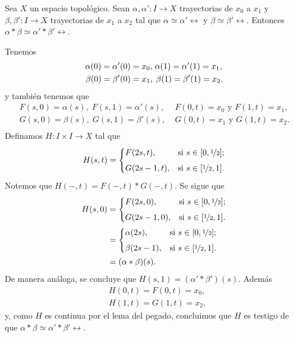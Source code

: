     \begin{lema}
        Sea $X$ un espacio topológico. Sean
        $\alpha,\alpha':I\to X$ trayectorias de $x_0$ a $x_1$ y $\beta,\beta':I\to X$ trayectorias de $x_1$ a $x_2$ tal que $\alpha\simeq\alpha'\rel$ y $\beta\simeq\beta'\rel$. Entonces $\alpha*\beta\simeq \alpha'*\beta'\rel.$
    \end{lema}
    \begin{dem}
        Tenemos 
        \begin{align*}
            \alpha(0)=\alpha'(0)=x_0,&\; \alpha(1)=\alpha'(1)=x_1,\\
            \beta(0)=\beta'(0)=x_1,&\;\hspace{0.5mm}
            \beta(1)=\beta'(1)=x_2.
        \end{align*}
        y también tenemos que
        \begin{align*}
            F(s,0)=\alpha(s),\; F(s,1)=\alpha'(s),&\; F(0,t)=x_0 \text{ y } F(1,t)=x_1,\\
            G(s,0)=\beta(s),\; G(s,1)=\beta'(s),&\; G(0,t)=x_1 \text{ y } G(1,t)=x_2.\\
        \end{align*}
        Definamos $H:I\times I\to X$ tal que 
    \begin{equation*}
        H(s,t)  =
    \begin{cases} 
        F(2s,t), & \text{si } s\in [0,\nicefrac{1}{2}]; \\[1ex]
        G(2s-1,t), & \text{si } s \in [\nicefrac{1}{2},1].
    \end{cases}
    \end{equation*}
        Notemos que $H(-,t)=F(-,t)*G(-,t)$. Se sigue que 
        \begin{align*}
        H(s,0) &= 
     \begin{cases} 
        F(2s,0), & \text{si } s\in [0,\nicefrac{1}{2}]; \\[1ex]
        G(2s-1,0), & \text{si } s \in [\nicefrac{1}{2},1].
    \end{cases}\\
    &= 
     \begin{cases} 
        \alpha(2s), & \text{si } s\in [0,\nicefrac{1}{2}]; \\[1ex]
       \beta(2s-1), & \text{si } s \in [\nicefrac{1}{2},1].
    \end{cases}\\
    &=(\alpha*\beta)(s).
    \end{align*}
    De manera análoga, se concluye que $H(s,1)=(\alpha'*\beta')(s)$. Además
    \begin{align*}
        &H(0,t)=F(0,t)=x_0,\\
        &H(1,t)=G(1,t)=x_2,
    \end{align*}
    y, como $H$ es continua por el lema del pegado, concluimos que $H$ es testigo de que $\alpha*\beta\simeq \alpha'*\beta'\rel$.
    \end{dem}
